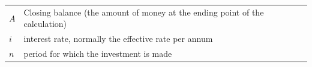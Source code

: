 \begin{itemize}[noitemsep]
{\begin{tabular}[t]{|l|l|}
                  $A$
                 &
        Closing balance (the amount of money at the ending point of the calculation)%
     \tabularnewline\cline{1-1}\cline{2-2}
                  $i$
                 &
        interest rate, normally the effective rate per annum%
     \tabularnewline\cline{1-1}\cline{2-2}
                  $n$
                 &
        period for which the investment is made%
     \tabularnewline\cline{1-1}\cline{2-2}
    \end{tabular}} %
\end{itemize}
